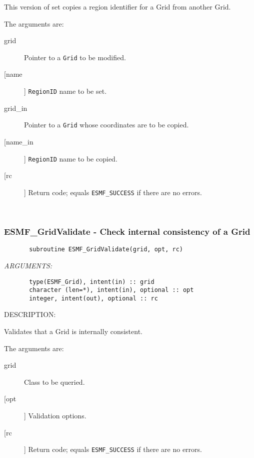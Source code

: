        This version of set copies a region identifier for a Grid from another
       Grid.
  
       The arguments are:
       \begin{description}
       \item[grid]
            Pointer to a {\tt Grid} to be modified.
       \item [[name]]
             {\tt RegionID} name to be set.
       \item[grid\_in]
            Pointer to a {\tt Grid} whose coordinates are to be copied.
       \item [[name\_in]]
             {\tt RegionID} name to be copied.
       \item[[rc]]
            Return code; equals {\tt ESMF\_SUCCESS} if there are no errors.
       \end{description}
   
 
\mbox{}\hrulefill\ 
 
\subsubsection{ESMF\_GridValidate - Check internal consistency of a Grid}


 
\begin{verbatim}       subroutine ESMF_GridValidate(grid, opt, rc)\end{verbatim}{\em ARGUMENTS:}
\begin{verbatim}       type(ESMF_Grid), intent(in) :: grid
       character (len=*), intent(in), optional :: opt
       integer, intent(out), optional :: rc\end{verbatim}
{\sf DESCRIPTION:\\ }


       Validates that a Grid is internally consistent.
  
       The arguments are:
       \begin{description}
       \item[grid]
            Class to be queried.
       \item[[opt]]
            Validation options.
       \item[[rc]]
            Return code; equals {\tt ESMF\_SUCCESS} if there are no errors.
       \end{description}
   
 
